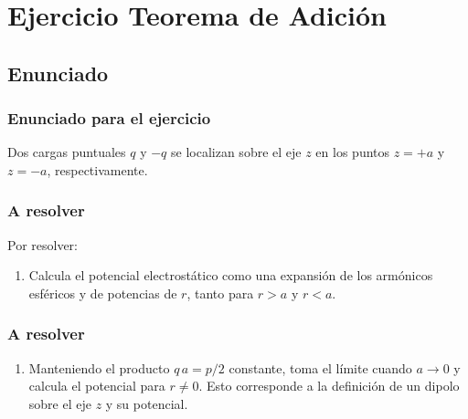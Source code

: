 \documentclass[12pt]{beamer}
\begin{document}
\section{Ejercicio Teorema de Adición}
\subsection{Enunciado}

\begin{frame}
\frametitle{Enunciado para el ejercicio}
Dos cargas puntuales $q$ y $-q$ se localizan sobre el eje $z$ en los puntos $z = +a$ y $z = -a$, respectivamente.
\pause
\begin{figure}[H]
    \centering
\end{figure}
\end{frame}
\begin{frame}
\frametitle{A resolver}
Por resolver:
\pause
{}
\begin{enumerate}[<+->]
\item \label{item:inciso_1} Calcula el potencial electrostático como una expansión de los armónicos esféricos y de potencias de $r$, tanto para $r > a$ y $r < a$.
\seti
\end{enumerate}
\end{frame}
\begin{frame}
\frametitle{A resolver}
\begin{enumerate}[<+->]    
\conti
\item \label{item:inciso_2} Manteniendo el producto $q \, a = p /2$ constante, toma el límite cuando $a \to 0$ y calcula el potencial para $r \neq 0$. \pause Esto corresponde a la definición de un dipolo sobre el eje $z$ y su potencial.
\seti
\end{enumerate}
\end{frame}
\end{document}
